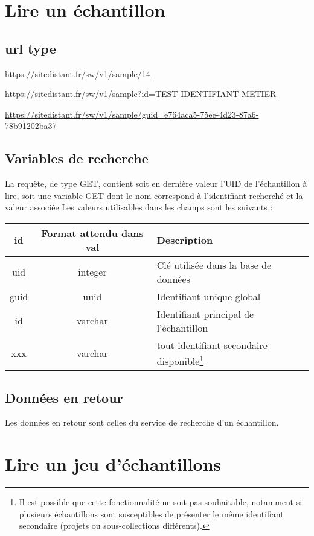 \section{Lire un échantillon}

\subsection{url type}
\url{https://sitedistant.fr/sw/v1/sample/14}

\url{https://sitedistant.fr/sw/v1/sample?id=TEST-IDENTIFIANT-METIER}

\url{https://sitedistant.fr/sw/v1/sample/guid=e764aca5-75ee-4d23-87a6-78b91202ba37}

\subsection{Variables de recherche}
La requête, de type GET, contient soit en dernière valeur l'UID de l'échantillon à lire, soit une variable GET dont le nom correspond à l'identifiant recherché et la valeur associée
Les valeurs utilisables dans les champs sont les suivants :
\begin{savenotes}
\begin{longtable}{|c|c|>{\raggedright\arraybackslash}p{6cm}|}
\hline 
id & Format attendu dans val & Description \\ 
\hline
uid & integer & Clé utilisée dans la base de données \\
\hline
guid & uuid & Identifiant unique global \\
\hline
id & varchar & Identifiant principal de l'échantillon\\
\hline
xxx & varchar & tout identifiant secondaire disponible\footnote{Il est possible que cette fonctionnalité ne soit pas souhaitable, notamment si plusieurs échantillons sont susceptibles de présenter le même identifiant secondaire (projets ou sous-collections différents).}
\\
\hline \endhead

\end{longtable}
\end{savenotes}

\subsection{Données en retour}
Les données en retour sont celles du service de recherche d'un échantillon.

\section{Lire un jeu d'échantillons}
